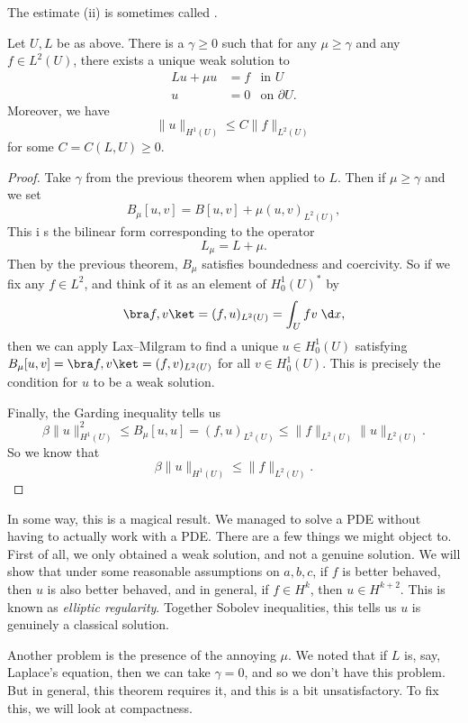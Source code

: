 \documentclass[a4paper]{article}
\begin{document}
The estimate (ii) is sometimes called . %

\begin{thm}
  Let $U, L$ be as above. There is a $\gamma \geq 0$ such that for any $\mu \geq \gamma$ and any $f \in L^2(U)$, there exists a unique weak solution to
  \begin{align*}
    Lu + \mu u &= f & \text{in $U$}\\
    u &= 0 & \text{on $\partial U$}.
  \end{align*}
  Moreover, we have
  \[
    \|u\|_{H^1(U)} \leq C \|f\|_{L^2(U)}
  \]
  for some $C = C(L, U) \geq 0$.
\end{thm}

\begin{proof}
  Take $\gamma$ from the previous theorem when applied to $L$. Then if $\mu \geq \gamma$ and we set
  \[
    B_\mu[u, v] = B[u, v] + \mu (u, v)_{L^2(U)},
  \]
  This i s the bilinear form corresponding to the operator
  \[
    L_\mu = L + \mu.
  \]
  Then by the previous theorem, $B_\mu$ satisfies boundedness and coercivity. So if we fix any $f \in L^2$, and think of it as an element of $H_0^1(U)^*$ by
  \[
    \bra f, v \ket = (f, u)_{L^2(U)} = \int_U fv\;\d x,
  \]
  then we can apply Lax--Milgram to find a unique $u \in H_0^1(U)$ satisfying $B_\mu[u, v] = \bra f, v\ket = (f, v)_{L^2(U)}$ for all $v \in H_0^1(U)$. This is precisely the condition for $u$ to be a weak solution.

  Finally, the Garding inequality tells us
  \[
    \beta \|u\|_{H^1(U)}^2 \leq B_\mu[u, u] = (f, u)_{L^2(U)} \leq \|f\|_{L^2(U)} \|u\|_{L^2(U)}.
  \]
  So we know that
  \[
    \beta \|u\|_{H^1(U)} \leq \|f\|_{L^2(U)}.
  \]
\end{proof}
In some way, this is a magical result. We managed to solve a PDE without having to actually work with a PDE. There are a few things we might object to. First of all, we only obtained a weak solution, and not a genuine solution. We will show that under some reasonable assumptions on $a, b, c$, if $f$ is better behaved, then $u$ is also better behaved, and in general, if $f \in H^k$, then $u \in H^{k + 2}$. This is known as \emph{elliptic regularity}. Together Sobolev inequalities, this tells us $u$ is genuinely a classical solution.

Another problem is the presence of the annoying $\mu$. We noted that if $L$ is, say, Laplace's equation, then we can take $\gamma = 0$, and so we don't have this problem. But in general, this theorem requires it, and this is a bit unsatisfactory. To fix this, we will look at compactness.
\end{document}
